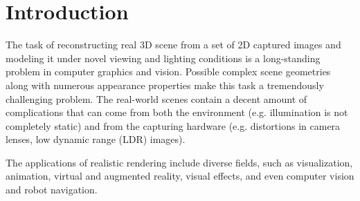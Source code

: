 \chapter{Introduction}
\label{chap:introduction}





The task of reconstructing real 3D scene from a set of 2D captured images
and modeling it under novel viewing and lighting conditions
is a long-standing problem in computer graphics and vision.
Possible complex scene geometries along with numerous appearance properties
make this task a tremendously challenging problem.
The real-world scenes contain a decent amount of complications
that can come from both the environment (e.g. illumination is not completely static)
and from the capturing hardware (e.g. distortions in camera lenses, low dynamic range (LDR) images).

The applications of realistic rendering include diverse fields,
such as visualization, animation, virtual and augmented reality, visual effects,
and even computer vision and robot navigation.



